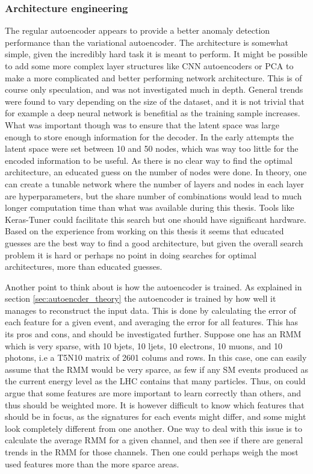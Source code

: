 \subsubsection*{Architecture engineering}
The regular autoencoder appears to provide a better anomaly detection performance than the variational autoencoder. 
The architecture is somewhat simple, given the incredibly hard task it is meant to perform. It might be possible to 
add some more complex layer structures like CNN autoencoders or PCA to make a more complicated and better performing 
network architecture. This is of course only speculation, and was not investigated much in depth. General trends were 
found to vary depending on the size of the dataset, and it is not trivial that for example a deep neural network is 
benefitial as the training sample increases. What was important though was to ensure that the latent space was large 
enough to store enough information for the decoder. In the early attempts the latent space were set between 10 and 50 
nodes, which was way too little for the encoded information to be useful. As there is no clear way to find the optimal 
architecture, an educated guess on the number of nodes were done. In theory, one can create a tunable network where 
the number of layers and nodes in each layer are hyperparameters, but the share number of combinations would lead to 
much longer computation time than what was available during this thesis. Tools like Keras-Tuner could facilitate 
this search but one should have significant hardware. Based on the experience from working on this thesis it seems 
that educated guesses are the best way to find a good architecture, but given the overall search problem it is hard 
or perhaps no point in doing searches for optimal architectures, more than educated guesses. \par 
Another point to think about is how the autoencoder is trained. As explained in section \ref{sec:autoencder_theory}
the autoencoder is trained by how well it manages to reconstruct the input data. This is done by 
calculating the error of each feature for a given event, and averaging the error for all features. 
This has its pros and cons, and should be investigated further. Suppose one has an RMM which is very sparse, 
with 10 bjets, 10 ljets, 10 electrons, 10 muons, and 10 photons, i.e a T5N10 matrix of 2601 colums and rows. 
In this case, one can easily assume that the RMM would be very sparce, as few if any SM events produced 
as the current energy level as the LHC contains that many particles. Thus, on could argue that some features 
are more important to learn correctly than others, and thus should be weighted more. It is however difficult to 
know which features that should be in focus, as the signatures for each events might differ, and some 
might look completely different from one another. One way to deal with this issue is to calculate 
the average RMM for a given channel, and then see if there are general trends in the RMM for those channels. 
Then one could perhaps weigh the most used features more than the more sparce areas. 